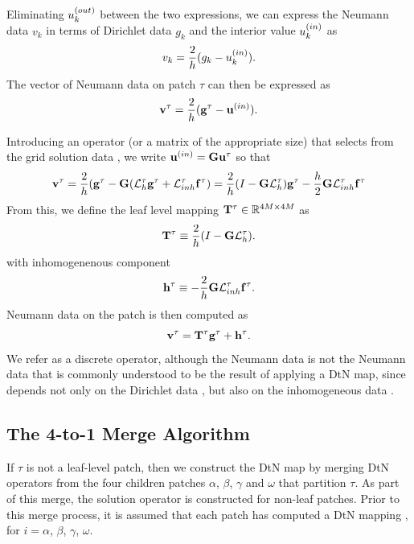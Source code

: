 Eliminating $u_k^{(out)}$  between the two expressions, we  can express the Neumann data $v_k$ in terms of Dirichlet data $g_k$ and the interior value $u_k^{(in)}$ as
\begin{equation}
v_k = \frac{2}{h}(g_k - u_k^{(in)}).
\end{equation}
The vector of Neumann data on patch $\tau$ can then be expressed as 
\begin{equation}
\mathbf v^{\tau} = \frac{2}{h}(\mathbf g^{\tau} - \mathbf u^{(in)}).
\end{equation}   

Introducing an operator (or a matrix of the appropriate size) \Gop that selects \uin from the grid solution data \utau, we write $\mathbf u^{(in)} = \mathbf G \mathbf u^{\tau}$ so that
\begin{equation}
\mathbf v^{\tau} = \frac{2}{h}(\mathbf g^{\tau} - \mathbf G (\mathcal L_h^{\tau} \mathbf g^{\tau} + \mathcal L_{inh}^{\tau} \mathbf f^{\tau}) = 
\frac{2}{h}(I - \mathbf G \mathcal L_h^{\tau})\mathbf g^{\tau} - \frac{h}{2}\mathbf G \mathcal L_{inh}^{\tau} \mathbf f^{\tau}
\end{equation}
From this, we define the leaf level \DtN mapping $\mathbf T^{\tau} \in \mathbb R^{4M \times 4M}$ as
\begin{equation}
\mathbf T^{\tau} \equiv \frac{2}{h}(I - \mathbf G\mathcal L_h^{\tau}).
\label{eq:Ttau-leaf}
\end{equation}
with inhomogenenous component
\begin{equation}
\mathbf h^{\tau} \equiv -\frac{2}{h}\mathbf G\mathcal L_{inh}^{\tau} \mathbf f^{\tau}.
\label{eq:htau-leaf}
\end{equation}
Neumann data on the patch is then computed as
\begin{equation}
\mathbf v^{\tau} = \mathbf T^{\tau} \mathbf g^{\tau} + \mathbf h^{\tau}.
\label{eq:vtau}
\end{equation}
We refer \Ttau as a discrete \DtN operator, although the Neumann data \vtau is not the Neumann data that is commonly understood to be the result of applying a DtN map, since \vtau depends not only on the Dirichlet data \gtau, but also on the inhomogeneous data \ftau.  

\subsection{The 4-to-1 Merge Algorithm}
\label{sub:4-to-1merge}
If $\tau$ is not a leaf-level patch, then we construct the DtN map  by merging DtN operators from the four children patches $\alpha$, $\beta$, $\gamma$ and $\omega$ that partition $\tau$. As part of this merge, the solution operator \Stau is constructed for non-leaf patches. Prior to this merge process, it is assumed that each patch has computed a DtN mapping \Ti, for $i=\alpha$, $\beta$, $\gamma$, $\omega$. 

